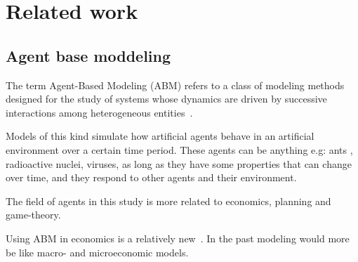 \section{Related work}

\subsection{Agent base moddeling}
The term Agent-Based Modeling (ABM) refers to a class of modeling    methods designed for the study of systems whose dynamics are driven by successive interactions among heterogeneous entities~\cite{tesfatsion2023agent}.

Models of this kind simulate how artificial agents behave in an artificial environment over a certain time period.
These agents can be anything e.g: ants , radioactive nuclei, viruses, as long as they have some properties that can change over time, and they respond to other agents and their environment.

The field of agents in this study is more related to economics, planning and game-theory.

Using ABM in economics is a relatively new~\cite{hamill2016agent}.
In the past modeling would more be like macro- and microeconomic models.







